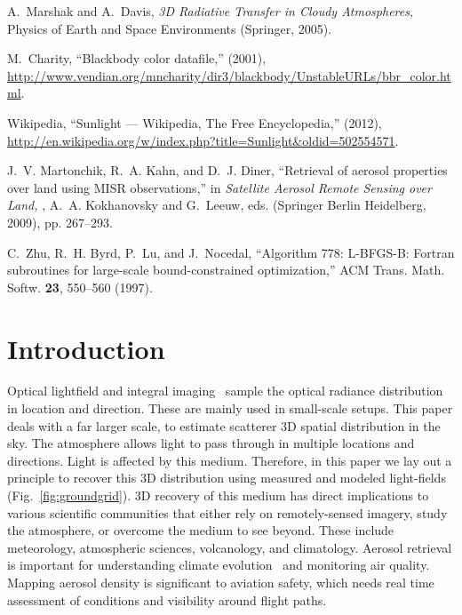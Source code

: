 \documentclass[10pt,letterpaper]{article}
\begin{document}
\begin{thebibliography}{10}
A.~Marshak and A.~Davis, \emph{{3D Radiative Transfer in Cloudy Atmospheres}},
  Physics of Earth and Space Environments (Springer, 2005).

M.~Charity, \enquote{{Blackbody color datafile},}  (2001), \url{http://www.vendian.org/mncharity/dir3/blackbody/UnstableURLs/bbr\_color.html}.

Wikipedia, \enquote{{Sunlight --- {W}ikipedia{,} The Free Encyclopedia},}  (2012), \url{http://en.wikipedia.org/w/index.php?title=Sunlight\&oldid=502554571}.

J.~V. Martonchik, R.~A. Kahn, and D.~J. Diner, \enquote{{Retrieval of aerosol
  properties over land using MISR observations},} in \emph{{Satellite Aerosol
  Remote Sensing over Land,}} , A.~A. Kokhanovsky and G.~Leeuw, eds. (Springer
  Berlin Heidelberg, 2009), pp. 267--293.

C.~Zhu, R.~H. Byrd, P.~Lu, and J.~Nocedal, \enquote{{Algorithm 778: L-BFGS-B:
  Fortran subroutines for large-scale bound-constrained optimization},} ACM
  Trans. Math. Softw. \textbf{23}, 550--560 (1997).

\end{thebibliography}


\section{Introduction}
\label{sec:intro}

Optical lightfield and integral imaging~\cite{Stern2006,kim,Ng1948}
sample the optical radiance distribution in location and
direction. These are mainly used in small-scale setups. This paper
deals with a far larger scale, to estimate scatterer 3D spatial
distribution in the sky.  The atmosphere allows light to pass through
in multiple locations and directions. Light is affected by this
medium. Therefore, in this paper we lay out a principle to recover
this 3D distribution using measured and modeled light-fields
(Fig.~\ref{fig:groundgrid}).
3D recovery of this medium has direct implications to various
scientific communities that either rely on remotely-sensed imagery,
study the atmosphere, or overcome the medium to see beyond. These
include meteorology, atmospheric sciences, volcanology, and
climatology.  Aerosol retrieval is important for understanding climate
evolution~\cite{Dayan2008,kalashnikova} and monitoring air
quality. Mapping aerosol density is significant to aviation safety,
which needs real time assessment of conditions and visibility around
flight paths.
\end{document}
